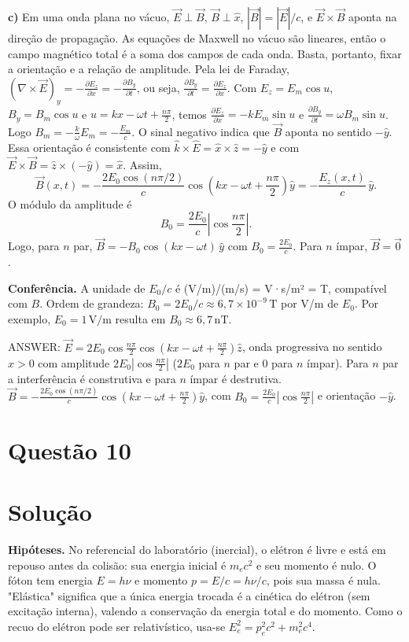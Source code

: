 \documentclass{article}%
\begin{document}
\textbf{c)} Em uma onda plana no vácuo, $\vec{E}\perp\vec{B}$, $\vec{B}\perp\hat{x}$, $|\vec{B}|=|\vec{E}|/c$, e $\vec{E}\times\vec{B}$ aponta na direção de propagação. As equações de Maxwell no vácuo são lineares, então o campo magnético total é a soma dos campos de cada onda. Basta, portanto, fixar a orientação e a relação de amplitude. Pela lei de Faraday, $(\nabla\times\vec{E})_y=-\frac{\partial E_z}{\partial x}=-\frac{\partial B_y}{\partial t}$, ou seja, $\frac{\partial B_y}{\partial t}=\frac{\partial E_z}{\partial x}$. Com $E_z=E_m\cos u$, $B_y=B_m\cos u$ e $u=kx-\omega t+\frac{n\pi}{2}$, temos $\frac{\partial E_z}{\partial x}=-kE_m\sin u$ e $\frac{\partial B_y}{\partial t}=\omega B_m\sin u$. Logo $B_m=-\frac{k}{\omega}E_m=-\frac{E_m}{c}$.
O sinal negativo indica que $\vec{B}$ aponta no sentido $-\hat{y}$. Essa orientação é consistente com $\hat{k}\times\hat{E}=\hat{x}\times\hat{z}=-\hat{y}$ e com $\vec{E}\times\vec{B}=\hat{z}\times(-\hat{y})=\hat{x}$. Assim,
\[
\vec{B}(x,t)=-\frac{2E_0\cos(n\pi/2)}{c}\cos\left(kx-\omega t+\frac{n\pi}{2}\right)\hat{y}=-\frac{E_z(x,t)}{c}\,\hat{y}.
\]
O módulo da amplitude é
\[
B_0=\frac{2E_0}{c}\left|\cos\frac{n\pi}{2}\right|.
\]
Logo, para $n$ par, $\vec{B}=-B_0\cos(kx-\omega t)\,\hat{y}$ com $B_0=\frac{2E_0}{c}$. Para $n$ ímpar, $\vec{B}=\vec{0}$.

\textbf{Conferência.} A unidade de $E_0/c$ é (V/m)/(m/s) = V·s/m² = T, compatível com $B$. Ordem de grandeza: $B_0=2E_0/c\approx 6{,}7\times 10^{-9}\,\text{T}$ por V/m de $E_0$. Por exemplo, $E_0=1\,\text{V/m}$ resulta em $B_0\approx 6{,}7\,\text{nT}$.

ANSWER: $\vec{E}=2E_0\cos\frac{n\pi}{2}\cos\left(kx-\omega t+\frac{n\pi}{2}\right)\hat{z}$, onda progressiva no sentido $x>0$ com amplitude $2E_0\left|\cos\frac{n\pi}{2}\right|$ ($2E_0$ para $n$ par e $0$ para $n$ ímpar). Para $n$ par a interferência é construtiva e para $n$ ímpar é destrutiva. $\vec{B}=-\frac{2E_0\cos(n\pi/2)}{c}\cos\left(kx-\omega t+\frac{n\pi}{2}\right)\hat{y}$, com $B_0=\frac{2E_0}{c}\left|\cos\frac{n\pi}{2}\right|$ e orientação $-\hat{y}$.%
\newpage%
\section*{Questão 10}

\section*{Solução}

\textbf{Hipóteses.} No referencial do laboratório (inercial), o elétron é livre e está em repouso antes da colisão: sua energia inicial é $m_ec^2$ e seu momento é nulo. O fóton tem energia $E=h\nu$ e momento $p=E/c=h\nu/c$, pois sua massa é nula. "Elástica" significa que a única energia trocada é a cinética do elétron (sem excitação interna), valendo a conservação da energia total e do momento. Como o recuo do elétron pode ser relativístico, usa-se $E_e^2=p_e^2c^2+m_e^2c^4$.
\end{document}
